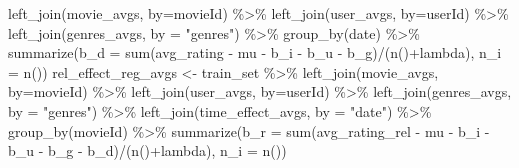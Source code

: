 \documentclass[
]{article}
\newenvironment{Shaded}{}{}
\newcommand{\AttributeTok}[1]{\textcolor[rgb]{0.49,0.56,0.16}{#1}}
\newcommand{\FunctionTok}[1]{\textcolor[rgb]{0.02,0.16,0.49}{#1}}
\newcommand{\NormalTok}[1]{#1}
\newcommand{\OtherTok}[1]{\textcolor[rgb]{0.00,0.44,0.13}{#1}}
\newcommand{\SpecialCharTok}[1]{\textcolor[rgb]{0.25,0.44,0.63}{#1}}
\newcommand{\StringTok}[1]{\textcolor[rgb]{0.25,0.44,0.63}{#1}}
\begin{document}
\begin{Shaded}
\begin{Highlighting}[]
  \FunctionTok{left\_join}\NormalTok{(movie\_avgs, }\AttributeTok{by=}\StringTok{\textquotesingle{}movieId\textquotesingle{}}\NormalTok{) }\SpecialCharTok{\%\textgreater{}\%}
  \FunctionTok{left\_join}\NormalTok{(user\_avgs, }\AttributeTok{by=}\StringTok{\textquotesingle{}userId\textquotesingle{}}\NormalTok{) }\SpecialCharTok{\%\textgreater{}\%} 
  \FunctionTok{left\_join}\NormalTok{(genres\_avgs, }\AttributeTok{by =} \StringTok{"genres"}\NormalTok{) }\SpecialCharTok{\%\textgreater{}\%} 
    \FunctionTok{group\_by}\NormalTok{(date) }\SpecialCharTok{\%\textgreater{}\%} 
    \FunctionTok{summarize}\NormalTok{(}\AttributeTok{b\_d =} \FunctionTok{sum}\NormalTok{(avg\_rating }\SpecialCharTok{{-}}\NormalTok{ mu }\SpecialCharTok{{-}}\NormalTok{ b\_i }\SpecialCharTok{{-}}\NormalTok{ b\_u }\SpecialCharTok{{-}}\NormalTok{ b\_g)}\SpecialCharTok{/}\NormalTok{(}\FunctionTok{n}\NormalTok{()}\SpecialCharTok{+}\NormalTok{lambda), }\AttributeTok{n\_i =} \FunctionTok{n}\NormalTok{())}
\NormalTok{rel\_effect\_reg\_avgs }\OtherTok{\textless{}{-}}\NormalTok{ train\_set }\SpecialCharTok{\%\textgreater{}\%}
  \FunctionTok{left\_join}\NormalTok{(movie\_avgs, }\AttributeTok{by=}\StringTok{\textquotesingle{}movieId\textquotesingle{}}\NormalTok{) }\SpecialCharTok{\%\textgreater{}\%}
  \FunctionTok{left\_join}\NormalTok{(user\_avgs, }\AttributeTok{by=}\StringTok{\textquotesingle{}userId\textquotesingle{}}\NormalTok{) }\SpecialCharTok{\%\textgreater{}\%} 
  \FunctionTok{left\_join}\NormalTok{(genres\_avgs, }\AttributeTok{by =} \StringTok{"genres"}\NormalTok{) }\SpecialCharTok{\%\textgreater{}\%} 
  \FunctionTok{left\_join}\NormalTok{(time\_effect\_avgs, }\AttributeTok{by =} \StringTok{"date"}\NormalTok{) }\SpecialCharTok{\%\textgreater{}\%} 
  \FunctionTok{group\_by}\NormalTok{(movieId) }\SpecialCharTok{\%\textgreater{}\%} 
  \FunctionTok{summarize}\NormalTok{(}\AttributeTok{b\_r =} \FunctionTok{sum}\NormalTok{(avg\_rating\_rel }\SpecialCharTok{{-}}\NormalTok{ mu }\SpecialCharTok{{-}}\NormalTok{ b\_i }\SpecialCharTok{{-}}\NormalTok{ b\_u }\SpecialCharTok{{-}}\NormalTok{ b\_g }\SpecialCharTok{{-}}\NormalTok{ b\_d)}\SpecialCharTok{/}\NormalTok{(}\FunctionTok{n}\NormalTok{()}\SpecialCharTok{+}\NormalTok{lambda), }\AttributeTok{n\_i =} \FunctionTok{n}\NormalTok{())}


\end{Highlighting}
\end{Shaded}
\end{document}
